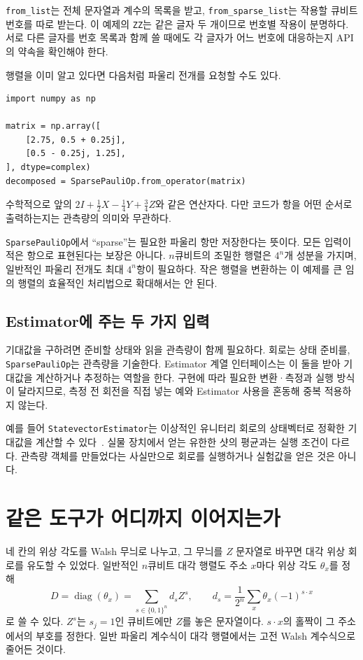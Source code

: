 \texttt{from\_list}는 전체 문자열과 계수의 목록을 받고,
\texttt{from\_sparse\_list}는 작용할 큐비트 번호를 따로 받는다.
이 예제의 \texttt{ZZ}는 같은 글자 두 개이므로 번호별 작용이 분명하다.
서로 다른 글자를 번호 목록과 함께 쓸 때에도 각 글자가 어느 번호에 대응하는지
API의 약속을 확인해야 한다.

행렬을 이미 알고 있다면 다음처럼 파울리 전개를 요청할 수도 있다.
\begin{verbatim}
import numpy as np

matrix = np.array([
    [2.75, 0.5 + 0.25j],
    [0.5 - 0.25j, 1.25],
], dtype=complex)
decomposed = SparsePauliOp.from_operator(matrix)
\end{verbatim}
수학적으로 앞의 \(2I+\tfrac12X-\tfrac14Y+\tfrac34Z\)와 같은 연산자다.
다만 코드가 항을 어떤 순서로 출력하는지는 관측량의 의미와 무관하다.

\texttt{SparsePauliOp}에서 ``sparse''는 필요한 파울리 항만 저장한다는 뜻이다.
모든 입력이 적은 항으로 표현된다는 보장은 아니다.
\(n\)큐비트의 조밀한 행렬은 \(4^n\)개 성분을 가지며,
일반적인 파울리 전개도 최대 \(4^n\)항이 필요하다.
작은 행렬을 변환하는 이 예제를 큰 임의 행렬의 효율적인 처리법으로 확대해서는 안 된다.

\subsection{Estimator에 주는 두 가지 입력}

기대값을 구하려면 준비할 상태와 읽을 관측량이 함께 필요하다.
회로는 상태 준비를, \texttt{SparsePauliOp}는 관측량을 기술한다.
Estimator 계열 인터페이스는 이 둘을 받아 기대값을 계산하거나 추정하는 역할을 한다.
구현에 따라 필요한 변환·측정과 실행 방식이 달라지므로,
측정 전 회전을 직접 넣는 예와 Estimator 사용을 혼동해 중복 적용하지 않는다.

예를 들어 \texttt{StatevectorEstimator}는 이상적인 유니터리 회로의 상태벡터로
정확한 기대값을 계산할 수 있다~\cite{ibm-estimator}.
실물 장치에서 얻는 유한한 샷의 평균과는 실행 조건이 다르다.
관측량 객체를 만들었다는 사실만으로 회로를 실행하거나 실험값을 얻은 것은 아니다.

\section{같은 도구가 어디까지 이어지는가}

네 칸의 위상 각도를 Walsh 무늬로 나누고, 그 무늬를 \(Z\) 문자열로 바꾸면
대각 위상 회로를 유도할 수 있었다.
일반적인 \(n\)큐비트 대각 행렬도 주소 \(x\)마다 위상 각도 \(\theta_x\)를 정해
\[
D=\operatorname{diag}(\theta_x)=\sum_{s\in\{0,1\}^n}d_sZ^s,
\qquad d_s=\frac1{2^n}\sum_x\theta_x(-1)^{s\cdot x}
\]
로 쓸 수 있다. \(Z^s\)는 \(s_j=1\)인 큐비트에만 \(Z\)를 놓은 문자열이다.
\(s\cdot x\)의 홀짝이 그 주소에서의 부호를 정한다.
일반 파울리 계수식이 대각 행렬에서는 고전 Walsh 계수식으로 줄어든 것이다.

